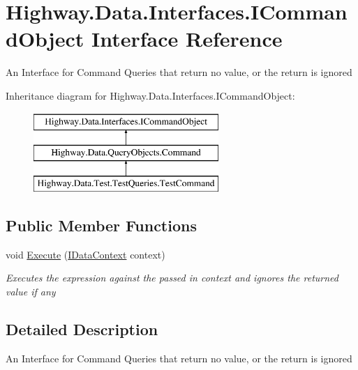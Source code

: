 \hypertarget{interface_highway_1_1_data_1_1_interfaces_1_1_i_command_object}{\section{Highway.\-Data.\-Interfaces.\-I\-Command\-Object Interface Reference}
\label{interface_highway_1_1_data_1_1_interfaces_1_1_i_command_object}
}


An Interface for Command Queries that return no value, or the return is ignored  


Inheritance diagram for Highway.\-Data.\-Interfaces.\-I\-Command\-Object\-:\begin{figure}[H]
\begin{center}
\leavevmode
\includegraphics[height=3.000000cm]{interface_highway_1_1_data_1_1_interfaces_1_1_i_command_object}
\end{center}
\end{figure}
\subsection*{Public Member Functions}
\begin{DoxyCompactItemize}
\item 
void \hyperlink{interface_highway_1_1_data_1_1_interfaces_1_1_i_command_object_a25d2d3b6e3bea3380b5a5f6df7a9b2d1}{Execute} (\hyperlink{interface_highway_1_1_data_1_1_interfaces_1_1_i_data_context}{I\-Data\-Context} context)
\begin{DoxyCompactList}\small\item\em Executes the expression against the passed in context and ignores the returned value if any \end{DoxyCompactList}\end{DoxyCompactItemize}


\subsection{Detailed Description}
An Interface for Command Queries that return no value, or the return is ignored 



